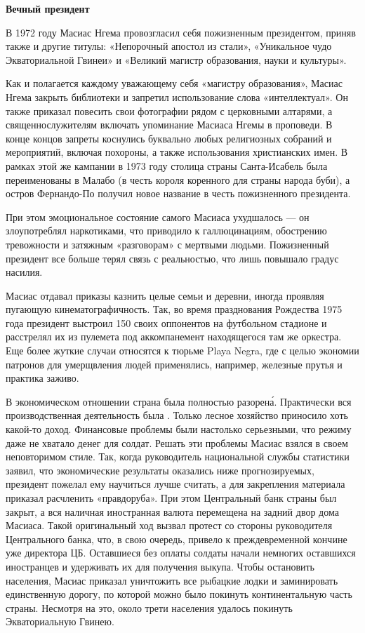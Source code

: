 \textbf{Вечный президент}

В 1972 году Масиас Нгема провозгласил себя пожизненным президентом, приняв также и другие титулы:
«Непорочный апостол из стали»,
«Уникальное чудо Экваториальной Гвинеи»
и «Великий магистр образования, науки и культуры».

Как и полагается каждому уважающему себя «магистру образования», Масиас Нгема  закрыть библиотеки и запретил использование слова «интеллектуал». Он также приказал повесить свои фотографии рядом с церковными алтарями, а священнослужителям включать упоминание Масиаса Нгемы в проповеди. В конце концов запреты коснулись буквально любых религиозных собраний и мероприятий, включая похороны, а также использования христианских имен. В рамках этой же кампании в 1973 году столица страны Санта-Исабель была переименованы в Малабо (в честь короля коренного для страны народа буби), а остров Фернандо-По получил новое название в честь пожизненного президента.

\begin{fancyquotes}
    При этом эмоциональное состояние самого Масиаса ухудшалось --- он злоупотреблял наркотиками, что приводило к галлюцинациям, обострению тревожности и затяжным «разговорам» с мертвыми людьми. Пожизненный президент все больше терял связь с реальностью, что лишь повышало градус насилия.
\end{fancyquotes}

Масиас отдавал приказы казнить целые семьи и деревни, иногда проявляя пугающую кинематографичность. Так, во время празднования Рождества 1975 года президент выстроил 150 своих оппонентов на футбольном стадионе и расстрелял их из пулемета под аккомпанемент находящегося там же оркестра. Еще более жуткие случаи относятся к тюрьме Playa Negra, где с целью экономии патронов для умерщвления людей применялись, например, железные прутья и практика  заживо.

В экономическом отношении страна была полностью разорен\'{а}. Практически вся производственная деятельность была . Только лесное хозяйство  приносило хоть какой-то доход. Финансовые проблемы были настолько серьезными, что режиму даже не хватало денег для солдат. Решать эти проблемы Масиас взялся в своем неповторимом стиле. Так, когда руководитель национальной службы статистики заявил, что экономические результаты оказались ниже прогнозируемых, президент пожелал ему научиться лучше считать, а для закрепления материала приказал расчленить «правдоруба». При этом Центральный банк страны был закрыт, а вся наличная иностранная валюта перемещена на задний двор дома Масиаса. Такой оригинальный ход вызвал протест со стороны руководителя Центрального банка, что, в свою очередь, привело к преждевременной кончине уже директора ЦБ. Оставшиеся без оплаты солдаты начали  немногих оставшихся иностранцев и удерживать их для получения выкупа. Чтобы остановить  населения, Масиас приказал уничтожить все рыбацкие лодки и заминировать единственную дорогу, по которой можно было покинуть континентальную часть страны. Несмотря на это, около трети населения удалось покинуть Экваториальную Гвинею.

